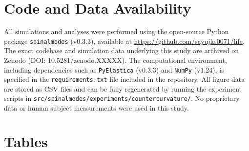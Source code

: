 \documentclass[11pt,a4paper]{article}
\begin{document}

\section*{Code and Data Availability}

All simulations and analyses were performed using the open-source Python package \texttt{spinalmodes} (v0.3.3), available at \url{https://github.com/sayujks0071/life}. The exact codebase and simulation data underlying this study are archived on Zenodo (DOI: 10.5281/zenodo.XXXXX). The computational environment, including dependencies such as \texttt{PyElastica} (v0.3.3) and \texttt{NumPy} (v1.24), is specified in the \texttt{requirements.txt} file included in the repository. All figure data are stored as CSV files and can be fully regenerated by running the experiment scripts in \texttt{src/spinalmodes/experiments/countercurvature/}. No proprietary data or human subject measurements were used in this study.


\section*{Tables}
\end{document}
